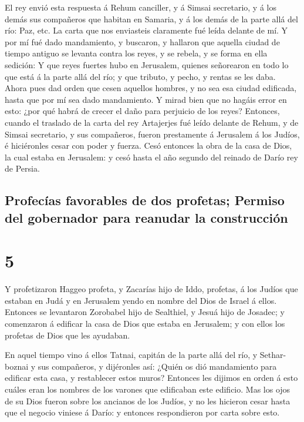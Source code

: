  El rey envió esta respuesta á Rehum canciller, y á
Simsai secretario, y á los demás sus compañeros que habitan en Samaria,
y á los demás de la parte allá del río: Paz, etc.  La
carta que nos enviasteis claramente fué leída delante de mí.
 Y por mí fué dado mandamiento, y buscaron, y hallaron
que aquella ciudad de tiempo antiguo se levanta contra los reyes, y se
rebela, y se forma en ella sedición:  Y que reyes fuertes
hubo en Jerusalem, quienes señorearon en todo lo que está á la parte
allá del río; y que tributo, y pecho, y rentas se les daba.
 Ahora pues dad orden que cesen aquellos hombres, y no
sea esa ciudad edificada, hasta que por mí sea dado mandamiento.
 Y mirad bien que no hagáis error en esto: ¿por qué habrá
de crecer el daño para perjuicio de los reyes?  Entonces,
cuando el traslado de la carta del rey Artajerjes fué leído delante de
Rehum, y de Simsai secretario, y sus compañeros, fueron prestamente á
Jerusalem á los Judíos, é hiciéronles cesar con poder y fuerza.
 Cesó entonces la obra de la casa de Dios, la cual estaba
en Jerusalem: y cesó hasta el año segundo del reinado de Darío rey de
Persia.

\hypertarget{profecuxedas-favorables-de-dos-profetas-permiso-del-gobernador-para-reanudar-la-construcciuxf3n}{%
\subsection{Profecías favorables de dos profetas; Permiso del gobernador
para reanudar la
construcción}\label{profecuxedas-favorables-de-dos-profetas-permiso-del-gobernador-para-reanudar-la-construcciuxf3n}}

\hypertarget{section-15-5}{%
\section{5}\label{section-15-5}}

 Y profetizaron Haggeo profeta, y Zacarías hijo de Iddo,
profetas, á los Judíos que estaban en Judá y en Jerusalem yendo en
nombre del Dios de Israel á ellos.  Entonces se levantaron
Zorobabel hijo de Sealthiel, y Jesuá hijo de Josadec; y comenzaron á
edificar la casa de Dios que estaba en Jerusalem; y con ellos los
profetas de Dios que les ayudaban.

 En aquel tiempo vino á ellos Tatnai, capitán de la parte
allá del río, y Sethar-boznai y sus compañeros, y dijéronles así: ¿Quién
os dió mandamiento para edificar esta casa, y restablecer estos muros?
 Entonces les dijimos en orden á esto cuáles eran los
nombres de los varones que edificaban este edificio.  Mas
los ojos de su Dios fueron sobre los ancianos de los Judíos, y no les
hicieron cesar hasta que el negocio viniese á Darío: y entonces
respondieron por carta sobre esto.

